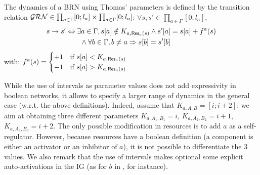 \begin{definition}\label{def:dynamics}
The dynamics of a BRN using Thomas' parameters is defined by the transition relation $\mathcal{GRN}{}{} \in \prod_{a \in \Gamma} [0;l_a] \times \prod_{a \in \Gamma} [0;l_a]$:
$\forall s, s' \in \prod_{a \in \Gamma} [0;l_a]$,
\begin{align*}
s \rightarrow s' &\Leftrightarrow \exists a \in \Gamma, {s[a]} \notin K_{a, \mathsf{Res}_{a}(s)} \wedge {s'[a]} = {s[a]} + f^a(s) \\
  & \qquad \wedge \forall b \in \Gamma, b \neq a \Rightarrow {s[b]} = {s'[b]}
\end{align*}
with: $f^a(s) = 
  \begin{cases}
    +1 & \text{if } {s[a]} < K_{a, \mathsf{Res}_{a}(s)} \\
    -1 & \text{if } {s[a]} > K_{a, \mathsf{Res}_{a}(s)} \\
  \end{cases}$
\begin{comment}
Let $s$ be a state of a BRN using Thomas' parameters $(\IG, K)$ where $\IG = (\Gamma, E_+, E_-)$.
The state that succeeds to $s$ is given by the indeterministic function $f(s)$:
\begin{align*}
  f(s)  & = s' \Leftrightarrow \exists a \in \Gamma,
    \GRNget{s'}{a} = f^a(s) \wedge
    \forall b \in \Gamma, b \neq a, \GRNget{s}{b} = \GRNget{s'}{b}
    \quad\text{, with}\\
  f^a(s) & =
  \begin{cases}
    \GRNget{s}{a} + 1 & \text{if } \GRNget{s}{a} < K_{a,A,B} \\%
    \GRNget{s}{a} & \text{if } \GRNget{s}{a} \in K_{a,A,B} \\ %
    \GRNget{s}{a} - 1 & \text{if } \GRNget{s}{a} > K_{a,A,B} %
  \end{cases}
\quad\text{, where $A,B=\GRNres{a}{s}$.}
\end{align*}
\end{comment}
\end{definition}

While the use of intervals as parameter values does not add expressivity in boolean
networks, it allows to specify a larger range of dynamics in the general case (w.r.t. the above
definitions).
Indeed, assume that $K_{a,A,B} = [i ; i+2]$;
we aim at obtaining three different parameters $K_{a,A_1,B_1} = i$,  $K_{a,A_2,B_2} = i+1$,
$K_{a,A_3,B_3} = i+2$.
The only possible modification in resources is to add $a$ as a self-regulator.
However, because resources have a boolean definition (a component is either an activator or an inhibitor of
$a$), it is not possible to differentiate the 3 values.
We also remark that the use of intervals makes optional some explicit auto-activations in the IG
(as for $b$ in , for instance).

